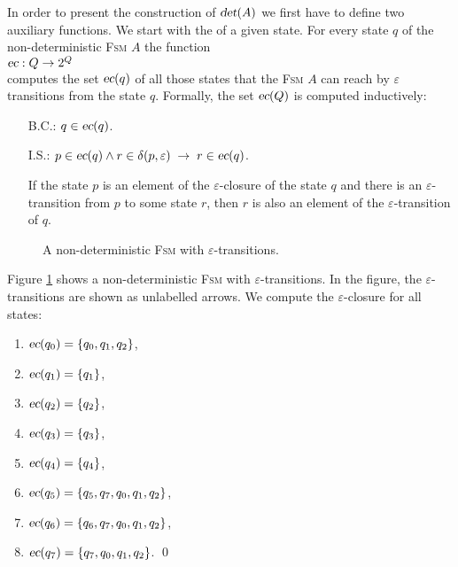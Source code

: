 In order to present the construction of $\textsl{det}(A)$ we first have to define two auxiliary functions.
We start with the   of a given state.  For every state
$q$ of the non-deterministic \textsc{Fsm} $A$ the function
\\[0.2cm]
\hspace*{1.3cm}
$\textsl{ec}: Q \rightarrow 2^Q$
\\[0.2cm]
computes the set $\textsl{ec}(q)$ of all those states that the \textsc{Fsm} $A$ can reach by $\varepsilon$
transitions from the state $q$.   Formally, the set $\textsl{ec}(Q)$ is computed inductively:
\begin{enumerate}
\item[B.C.:] $q \in \textsl{ec}(q)$.
\item[I.S.:] $p \in \textsl{ec}(q) \wedge r \in \delta(p, \varepsilon) \;\rightarrow\; r \in \textsl{ec}(q)$.
 
             If the state $p$ is an element of the $\varepsilon$-closure of the state $q$ and there is an
             $\varepsilon$-transition from $p$ to some state $r$, then $r$ is also an element
             of the $\varepsilon$-transition of $q$. 
\end{enumerate}


\begin{figure}[!ht]
  \centering

   \caption{A non-deterministic \textsc{Fsm} with $\varepsilon$-transitions.}
  \label{fig:ab-or-ba-star.dot}
\end{figure}

\exampleEng
Figure \ref{fig:ab-or-ba-star.dot} shows a non-deterministic \textsc{Fsm} with 
$\varepsilon$-transitions.   In the figure, the $\varepsilon$-transitions are shown as unlabelled arrows.
We compute the $\varepsilon$-closure for all states:
\begin{enumerate}
\item $\textsl{ec}(q_0) = \{ q_0, q_1, q_2 \}$,
\item $\textsl{ec}(q_1) = \{ q_1 \}$,
\item $\textsl{ec}(q_2) = \{ q_2 \}$,
\item $\textsl{ec}(q_3) = \{ q_3 \}$,
\item $\textsl{ec}(q_4) = \{ q_4 \}$,
\item $\textsl{ec}(q_5) = \{ q_5, q_7, q_0, q_1, q_2 \}$,
\item $\textsl{ec}(q_6) = \{ q_6, q_7, q_0, q_1, q_2 \}$,
\item $\textsl{ec}(q_7) = \{ q_7, q_0, q_1, q_2 \}$.
      \qed
\end{enumerate}

